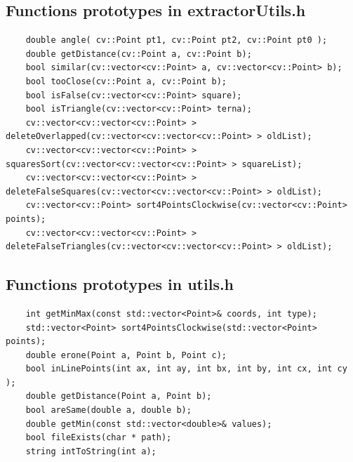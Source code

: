 	\subsection*{Functions prototypes in extractorUtils.h}
	\lstset{caption="", label=lst:prototypesA}
	\begin{lstlisting}
	double angle( cv::Point pt1, cv::Point pt2, cv::Point pt0 );
	double getDistance(cv::Point a, cv::Point b);
	bool similar(cv::vector<cv::Point> a, cv::vector<cv::Point> b);
	bool tooClose(cv::Point a, cv::Point b);
	bool isFalse(cv::vector<cv::Point> square);
	bool isTriangle(cv::vector<cv::Point> terna);
	cv::vector<cv::vector<cv::Point> > deleteOverlapped(cv::vector<cv::vector<cv::Point> > oldList);
	cv::vector<cv::vector<cv::Point> > squaresSort(cv::vector<cv::vector<cv::Point> > squareList);
	cv::vector<cv::vector<cv::Point> > deleteFalseSquares(cv::vector<cv::vector<cv::Point> > oldList);
	cv::vector<cv::Point> sort4PointsClockwise(cv::vector<cv::Point> points);
	cv::vector<cv::vector<cv::Point> > deleteFalseTriangles(cv::vector<cv::vector<cv::Point> > oldList);
	\end{lstlisting}

	\subsection*{Functions prototypes in utils.h}
	\lstset{caption="", label=lst:prototypesB}
	\begin{lstlisting}
	int getMinMax(const std::vector<Point>& coords, int type);
	std::vector<Point> sort4PointsClockwise(std::vector<Point> points);
	double erone(Point a, Point b, Point c);
	bool inLinePoints(int ax, int ay, int bx, int by, int cx, int cy );
	double getDistance(Point a, Point b);
	bool areSame(double a, double b);
	double getMin(const std::vector<double>& values);
	bool fileExists(char * path);
	string intToString(int a);
	\end{lstlisting}


	
